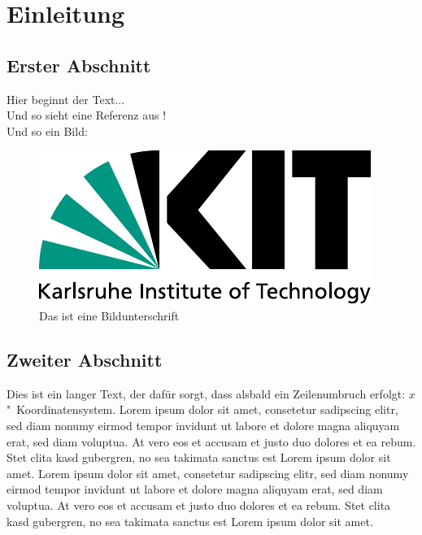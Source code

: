 









\chapter{Einleitung}
\label{ch:Introduction}

\section{Erster Abschnitt}
Hier beginnt der Text...\\
%
Und so sieht eine Referenz aus \cite{becker2008a}!\\[3em]

%
Und so ein Bild:\\
\begin{figure}[h]
  \begin{center}
    \includegraphics[width=.3\textwidth]{logos/KITLogo_RGB.pdf}
    \caption{Das ist eine Bildunterschrift \cite{becker2008a}}
  \end{center}
\end{figure}

\section{Zweiter Abschnitt}

Dies ist ein langer Text, der dafür sorgt, dass alsbald ein Zeilenumbruch erfolgt: $x$"~Koordinatensystem. Lorem ipsum dolor sit amet, consetetur sadipscing elitr, sed diam nonumy eirmod tempor invidunt ut labore et dolore magna aliquyam erat, sed diam voluptua. At vero eos et accusam et justo duo dolores et ea rebum. Stet clita kasd gubergren, no sea takimata sanctus est Lorem ipsum dolor sit amet. Lorem ipsum dolor sit amet, consetetur sadipscing elitr, sed diam nonumy eirmod tempor invidunt ut labore et dolore magna aliquyam erat, sed diam voluptua. At vero eos et accusam et justo duo dolores et ea rebum. Stet clita kasd gubergren, no sea takimata sanctus est Lorem ipsum dolor sit amet.



